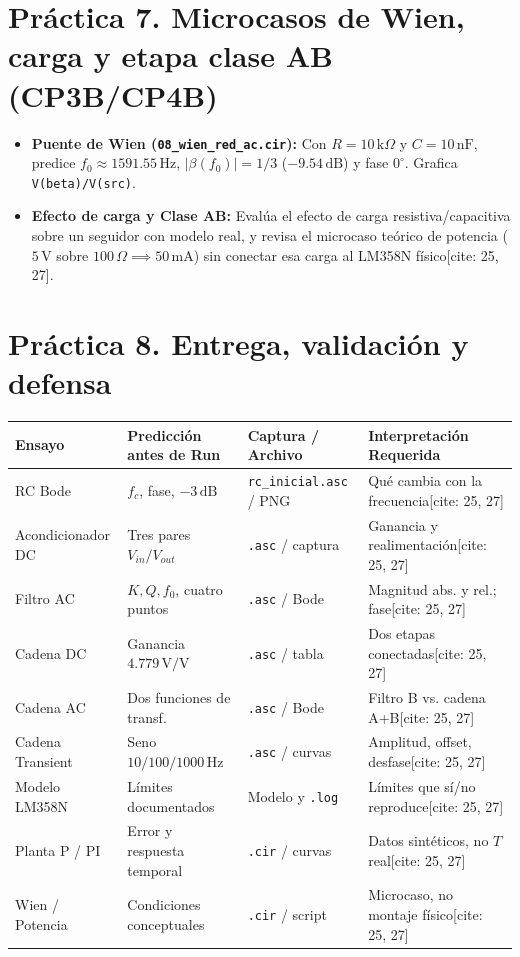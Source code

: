 \documentclass[10pt, a4paper]{article}
\begin{document}
\section{Práctica 7. Microcasos de Wien, carga y etapa clase AB (CP3B/CP4B)}
\begin{itemize}[noitemsep, leftmargin=*]
    \item \textbf{Puente de Wien (\texttt{08\_wien\_red\_ac.cir}):} Con $R = 10\,\text{k}\Omega$ y $C = 10\,\text{nF}$, predice $f_0 \approx 1591.55\,\text{Hz}$, $|\beta(f_0)| = 1/3$ ($-9.54\,\text{dB}$) y fase $0^\circ$. Grafica \texttt{V(beta)/V(src)}.
    \item \textbf{Efecto de carga y Clase AB:} Evalúa el efecto de carga resistiva/capacitiva sobre un seguidor con modelo real, y revisa el microcaso teórico de potencia ($5\,\text{V}$ sobre $100\,\Omega \implies 50\,\text{mA}$) sin conectar esa carga al LM358N físico[cite: 25, 27].
\end{itemize}

\section{Práctica 8. Entrega, validación y defensa}

\begin{center}
\footnotesize
\begin{tabularx}{\textwidth}{@{} l L L L @{}}
\toprule
\textbf{Ensayo} & \textbf{Predicción antes de Run} & \textbf{Captura / Archivo} & \textbf{Interpretación Requerida} \\ \midrule
RC Bode & $f_c$, fase, $-3\,\text{dB}$ & \texttt{rc\_inicial.asc} / PNG & Qué cambia con la frecuencia[cite: 25, 27] \\
Acondicionador DC & Tres pares $V_{in}/V_{out}$ & \texttt{.asc} / captura & Ganancia y realimentación[cite: 25, 27] \\
Filtro AC & $K, Q, f_0$, cuatro puntos & \texttt{.asc} / Bode & Magnitud abs. y rel.; fase[cite: 25, 27] \\
Cadena DC & Ganancia $4.779\,\text{V/V}$ & \texttt{.asc} / tabla & Dos etapas conectadas[cite: 25, 27] \\
Cadena AC & Dos funciones de transf. & \texttt{.asc} / Bode & Filtro B vs. cadena A+B[cite: 25, 27] \\
Cadena Transient & Seno $10/100/1000\,\text{Hz}$ & \texttt{.asc} / curvas & Amplitud, offset, desfase[cite: 25, 27] \\
Modelo LM358N & Límites documentados & Modelo y \texttt{.log} & Límites que sí/no reproduce[cite: 25, 27] \\
Planta P / PI & Error y respuesta temporal & \texttt{.cir} / curvas & Datos sintéticos, no $T$ real[cite: 25, 27] \\
Wien / Potencia & Condiciones conceptuales & \texttt{.cir} / script & Microcaso, no montaje físico[cite: 25, 27] \\ \bottomrule
\end{tabularx}
\end{center}
\end{document}
